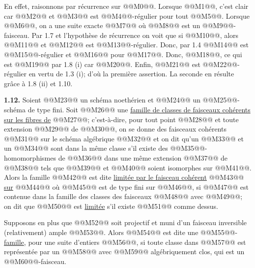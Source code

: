 
En
effet, raisonnons par récurrence sur @@M0@@. Lorsque @@M1@@, c'est clair car @@M2@@ et @@M3@@ est @@M4@@-régulier pour tout @@M5@@. Lorsque @@M6@@, on a une suite exacte @@M7@@ où @@M8@@ est un @@M9@@-faisceau. Par 1.7 et l'hypothèse de récurrence on voit que si @@M10@@, alors @@M11@@ et @@M12@@ est @@M13@@-régulier. Donc, par 1.4 @@M14@@ est @@M15@@-régulier et @@M16@@ pour @@M17@@. Donc, @@M18@@, ce qui est @@M19@@ par 1.8 (i) car @@M20@@. Enfin, @@M21@@ est @@M22@@-régulier en vertu de 1.3 (i); d'où la première assertion. La seconde en résulte grâce à 1.8 (ii) et 1.10.

\textbf{1.12.} Soient @@M23@@ un schéma noethérien et @@M24@@ un @@M25@@-schéma de type fini. Soit @@M26@@ une \uline{famille de classes de faisceaux cohérents sur les fibres de} @@M27@@; c'est-à-dire, pour tout point @@M28@@ et toute extension @@M29@@ de @@M30@@, on se donne des faisceaux cohérents @@M31@@ sur le schéma algébrique @@M32@@ et on dit qu'un @@M33@@ et un @@M34@@ sont dans la même classe s'il existe des @@M35@@-homomorphismes de @@M36@@ dans une même extension @@M37@@ de @@M38@@ tels que @@M39@@ et @@M40@@ soient isomorphes sur @@M41@@. Alors la famille @@M42@@ est dite \uline{limitée par le faisceau cohérent} @@M43@@ \uline{sur} @@M44@@ où @@M45@@ est de type fini sur @@M46@@, si @@M47@@ est contenue dans la famille des classes des faisceaux @@M48@@ avec @@M49@@; on dit que @@M50@@ est \uline{limitée} s'il existe @@M51@@ comme dessus.

Supposons en plus que @@M52@@ soit projectif et muni d'un faisceau inversible (relativement) ample @@M53@@. Alors @@M54@@ est dite une @@M55@@-\uline{famille}, pour une suite d'entiers @@M56@@, si toute classe dans @@M57@@ est représentée par un @@M58@@ avec @@M59@@ algébriquement clos, qui est un @@M60@@-faisceau.

